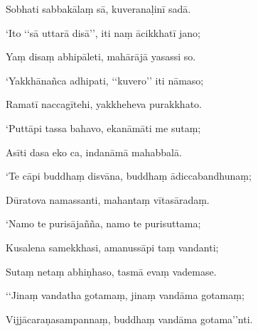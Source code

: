 Sobhati sabbakālaṃ sā, kuveranaḷinī sadā.

‘Ito ‘‘sā uttarā disā’’, iti naṃ ācikkhatī jano;

Yaṃ disaṃ abhipāleti, mahārājā yasassi so.

‘Yakkhānañca adhipati, ‘‘kuvero’’ iti nāmaso;

Ramatī naccagītehi, yakkheheva purakkhato.

‘Puttāpi tassa bahavo, ekanāmāti me sutaṃ;

Asīti dasa eko ca, indanāmā mahabbalā.

‘Te cāpi buddhaṃ disvāna, buddhaṃ ādiccabandhunaṃ;

Dūratova namassanti, mahantaṃ vītasāradaṃ.

‘Namo te purisājañña, namo te purisuttama;

Kusalena samekkhasi, amanussāpi taṃ vandanti;

Sutaṃ netaṃ abhiṇhaso, tasmā evaṃ vademase.

‘‘Jinaṃ vandatha gotamaṃ, jinaṃ vandāma gotamaṃ;

Vijjācaraṇasampannaṃ, buddhaṃ vandāma gotama’’nti.

